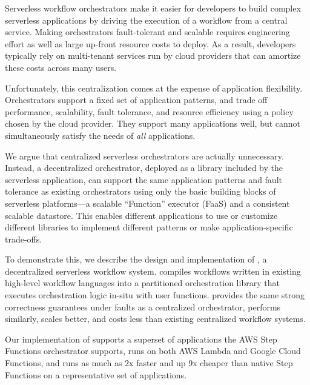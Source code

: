 Serverless workflow orchestrators make it easier for developers to build complex
serverless applications by driving the execution of a workflow from a central
service.  Making orchestrators fault-tolerant and scalable requires engineering
effort as well as large up-front resource costs to deploy. As a result,
developers typically rely on multi-tenant services run by cloud providers that
can amortize these costs across many users.

Unfortunately, this centralization comes at the expense of application
flexibility. Orchestrators support a fixed set of application patterns, and
trade off performance, scalability, fault tolerance, and resource efficiency
using a policy chosen by the cloud provider. They support many applications
well, but cannot simultaneously satisfy the needs of \emph{all} applications.

We argue that centralized serverless orchestrators are actually unnecessary.
Instead, a decentralized orchestrator, deployed as a library included by the
serverless application, can support the same application patterns and fault
tolerance as existing orchestrators using only the basic building blocks of
serverless platforms---a scalable ``Function'' executor (FaaS) and a consistent
scalable datastore. This enables different applications to use or customize
different libraries to implement different patterns or make application-specific
trade-offs.

To demonstrate this, we describe the design and implementation of \name{}, a
decentralized serverless workflow system. \name{} compiles workflows written in
existing high-level workflow languages into a partitioned orchestration library that
executes orchestration logic in-situ with user functions. \name{} provides the same
strong correctness guarantees under faults as a centralized orchestrator, performs
similarly, scales better, and costs less than existing centralized workflow
systems.

Our implementation of \name{} supports a superset of applications the AWS Step
Functions orchestrator supports, runs on both AWS Lambda and Google Cloud
Functions, and runs as much as 2x faster and up 9x cheaper than native Step
Functions on a representative set of applications.
